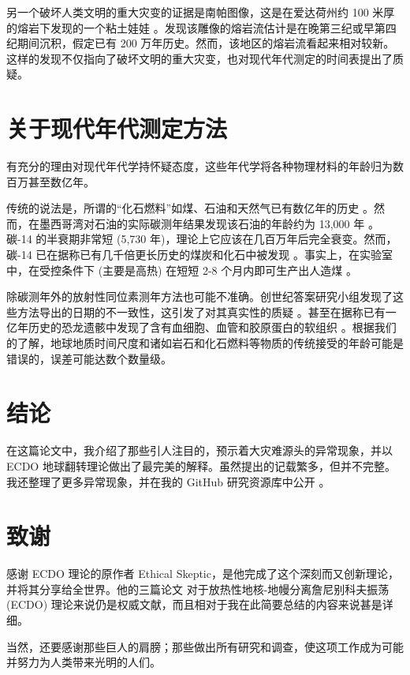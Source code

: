 \documentclass[10pt,twocolumn,letterpaper]{article}
\begin{document}
另一个破坏人类文明的重大灾变的证据是南帕图像，这是在爱达荷州约 100 米厚的熔岩下发现的一个粘土娃娃 \cite{102,103}。发现该雕像的熔岩流估计是在晚第三纪或早第四纪期间沉积，假定已有 200 万年历史。然而，该地区的熔岩流看起来相对较新。这样的发现不仅指向了破坏文明的重大灾变，也对现代年代测定的时间表提出了质疑。

\section{关于现代年代测定方法}

有充分的理由对现代年代学持怀疑态度，这些年代学将各种物理材料的年龄归为数百万甚至数亿年。

传统的说法是，所谓的“化石燃料”如煤、石油和天然气已有数亿年的历史 \cite{104}。然而，在墨西哥湾对石油的实际碳测年结果发现该石油的年龄约为 13,000 年 \cite{105}。碳-14 的半衰期非常短 (5,730 年)，理论上它应该在几百万年后完全衰变。然而，碳-14 已在据称已有几千倍更长历史的煤炭和化石中被发现 \cite{106}。事实上，在实验室中，在受控条件下 (主要是高热) 在短短 2-8 个月内即可生产出人造煤 \cite{107}。

除碳测年外的放射性同位素测年方法也可能不准确。创世纪答案研究小组发现了这些方法导出的日期的不一致性，这引发了对其真实性的质疑 \cite{108}。甚至在据称已有一亿年历史的恐龙遗骸中发现了含有血细胞、血管和胶原蛋白的软组织 \cite{109,110}。根据我们的了解，地球地质时间尺度和诸如岩石和化石燃料等物质的传统接受的年龄可能是错误的，误差可能达数个数量级。

\section{结论}

在这篇论文中，我介绍了那些引人注目的，预示着大灾难源头的异常现象，并以 ECDO 地球翻转理论做出了最完美的解释。虽然提出的记载繁多，但并不完整。我还整理了更多异常现象，并在我的 GitHub 研究资源库中公开 \cite{2}。

\section{致谢}

感谢 ECDO 理论的原作者 Ethical Skeptic，是他完成了这个深刻而又创新理论，并将其分享给全世界。他的三篇论文 \cite{1} 对于放热性地核-地幔分离詹尼别科夫振荡 (ECDO) 理论来说仍是权威文献，而且相对于我在此简要总结的内容来说甚是详细。

当然，还要感谢那些巨人的肩膀；那些做出所有研究和调查，使这项工作成为可能并努力为人类带来光明的人们。

\clearpage
\twocolumn

{\small
\renewcommand{\refname}{参考文献}


}
\end{document}
